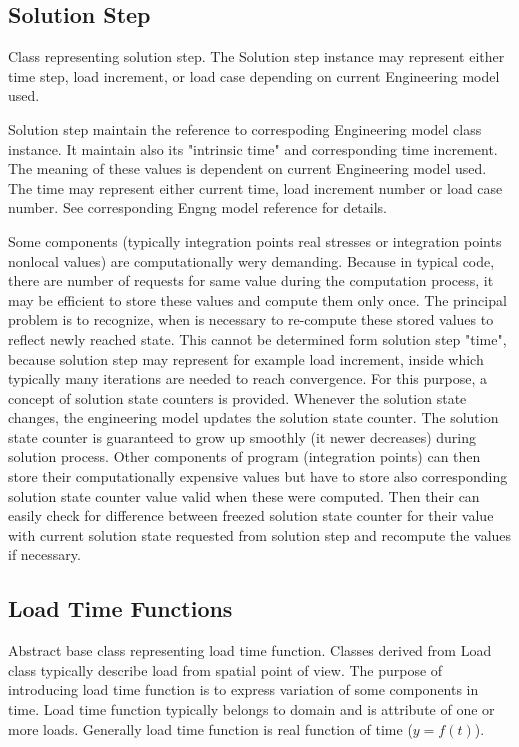 \documentclass[12pt,draft]{article}
\begin{document}
\subsection{Solution Step} 
Class representing solution step. The Solution step instance may represent either 
time step, load increment, or load case depending on current Engineering model used.

Solution step maintain the reference to correspoding Engineering model class instance.
It maintain also its "intrinsic time" and corresponding time increment. The meaning of these 
values is dependent on current Engineering model used. The time may represent either
current time, load increment number or load case number. See corresponding 
Engng model reference for details.
	
Some components (typically integration points real stresses or integration points nonlocal values)
are computationally wery demanding. Because in typical code, there are number of requests for same value 
during the computation process, it may be efficient to store these values and compute them only once.
The principal problem is to recognize, when is necessary to re-compute these stored values to reflect 
newly reached state. This cannot be determined form solution step "time", because solution step may 
represent for example load increment, inside which typically many iterations are needed to reach 
convergence. For this purpose, a concept of solution state counters is provided.
Whenever the solution state changes, the engineering model updates the solution state counter.
The solution state counter is guaranteed to grow up smoothly (it newer decreases) during solution process.
Other components of program (integration points) can then store their computationally expensive values
but have to store also corresponding solution state counter value valid when these were computed.
Then their can easily check for difference between freezed solution state counter for their value with 
current solution state requested from solution step and recompute the values if necessary.

\subsection{Load Time Functions}
Abstract base class representing load time function. Classes derived from Load class typically 
describe load from spatial point of view. The purpose of introducing load time function is to express
variation of some components in time. Load time function typically belongs to domain and is 
attribute of one or more loads. Generally load time function is real function of time ($y=f(t)$).
\end{document}
